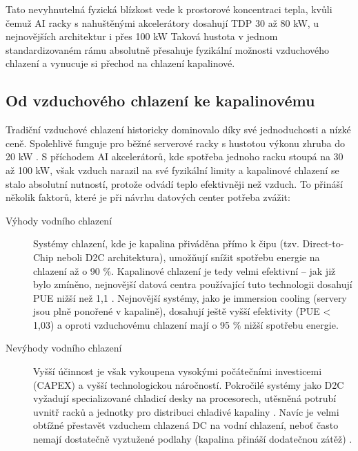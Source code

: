 Tato nevyhnutelná fyzická blízkost vede k prostorové koncentraci tepla, kvůli čemuž AI racky s nahuštěnými akcelerátory dosahují TDP 30 až 80 kW, u nejnovějších architektur i přes 100 kW  Taková hustota v jednom standardizovaném rámu absolutně přesahuje fyzikální možnosti vzduchového chlazení a vynucuje si přechod na chlazení kapalinové. \cite[s. 23]{cruzes_data_2025}

\subsection{Od vzduchového chlazení ke kapalinovému}
\label{subsec:vzduch}

Tradiční vzduchové chlazení historicky dominovalo díky své jednoduchosti a nízké ceně. Spolehlivě funguje pro běžné serverové racky s hustotou výkonu zhruba do 20 kW \cite[s. 10]{avelar_ai_2023}. S příchodem AI akcelerátorů, kde spotřeba jednoho racku stoupá na 30 až 100 kW, však vzduch narazil na své fyzikální limity a kapalinové chlazení se stalo absolutní nutností, protože odvádí teplo efektivněji než vzduch. \cite[s. 4]{chen_electricity_2025} To přináší několik faktorů, které je při návrhu datových center potřeba zvážit:

\begin{description}
    \item[Výhody vodního chlazení] Systémy chlazení, kde je kapalina přiváděna pří\-mo k čipu (tzv. Direct-to-Chip neboli D2C architektura), umožňují snížit spotřebu energie na chlazení až o 90 \%. Kapalinové chlazení je tedy velmi efektivní – jak již bylo zmíněno, nejnovější datová centra používající tuto technologii dosahují PUE nižší než 1,1 \cite{chen_electricity_2025, sheng_power_2026}. Nejnovější systémy, jako je immersion cooling (servery jsou plně ponořené v kapalině), dosahují ještě vyšší efektivity (PUE < 1,03) a oproti vzduchovému chlazení mají o 95 \% nižší spotřebu energie. \cite[s. 17--19]{cruzes_data_2025}
    \item[Nevýhody vodního chlazení] Vyšší účinnost je však vykoupena vysokými počátečními investicemi (CAPEX) a vyšší technologickou náročností. Pokročilé systémy jako D2C vyžadují specializované chladicí desky na procesorech, utěsněná potrubí uvnitř racků a jednotky pro distribuci chladivé kapaliny \cite[s. 18]{cruzes_data_2025}. Navíc je velmi obtížné přestavět vzduchem chlazená DC na vodní chlazení, neboť často nemají dostatečně vyztužené podlahy (kapalina přináší dodatečnou zátěž) \cite[s. 11]{avelar_ai_2023}.
\end{description}

